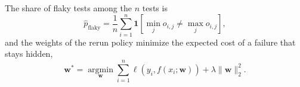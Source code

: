 
\usepackage{amsmath}
\usepackage[accsupp]{axessibility}

\visibleintro{} The share of flaky tests among the $n$ tests is
\begin{equation}
  \hat{p}_{\mathrm{flaky}} = \frac{1}{n} \sum_{i=1}^{n} \mathbf{1}\left[ \min_{j} o_{i,j} \neq \max_{j} o_{i,j} \right],
\end{equation}
and the weights of the rerun policy minimize the expected cost of a failure that stays hidden,
\begin{equation}
  \mathbf{w}^{*} = \operatorname*{argmin}_{\mathbf{w}} \sum_{i=1}^{n} \ell\left(y_i, f(x_i; \mathbf{w})\right) + \lambda \lVert \mathbf{w} \rVert_2^2 .
\end{equation}

\visibleresults

